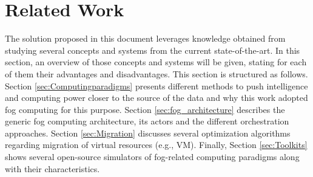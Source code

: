 \section{Related Work}
\label{sec:RelatedWork}

The solution proposed in this document leverages knowledge obtained from studying several concepts and systems from the current state-of-the-art. In this section, an overview of those concepts and systems will be given, stating for each of them their advantages and disadvantages. This section is structured as follows. Section \ref{sec:Computingparadigms} presents different methods to push intelligence and computing power closer to the source of the data and why this work adopted fog computing for this purpose. Section \ref{sec:fog_architecture} describes the generic fog computing architecture, its actors and the different orchestration approaches. Section \ref{sec:Migration} discusses several optimization algorithms regarding migration of virtual resources (e.g., VM). Finally, Section \ref{sec:Toolkits} shows several open-source simulators of fog-related computing paradigms along with their characteristics.




